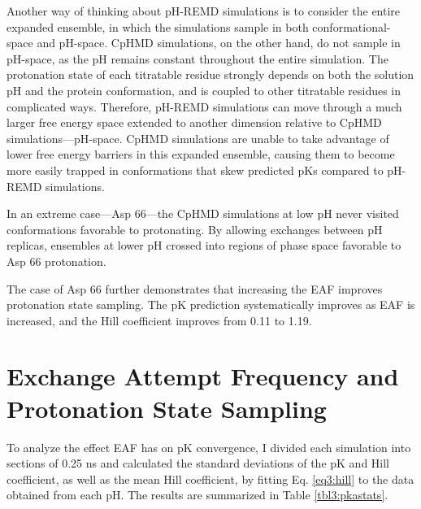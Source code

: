 Another way of thinking about pH-REMD simulations is to consider the entire
expanded ensemble, in which the simulations sample in both conformational-space
and pH-space.  CpHMD simulations, on the other hand, do not sample in pH-space,
as the pH remains constant throughout the entire simulation.  The protonation
state of each titratable residue strongly depends on both the solution pH and
the protein conformation, and is coupled to other titratable residues in
complicated ways.  Therefore, pH-REMD simulations can move through a much larger
free energy space extended to another dimension relative to CpHMD
simulations---pH-space.  CpHMD simulations are unable to take advantage of lower
free energy barriers in this expanded ensemble, causing them to become more
easily trapped in conformations that skew predicted pKs compared to
pH-REMD simulations.

In an extreme case---Asp 66---the CpHMD simulations at low pH never visited
conformations favorable to protonating.  By allowing exchanges between pH
replicas, ensembles at lower pH crossed into regions of phase space favorable to
Asp 66 protonation.

The case of Asp 66 further demonstrates that increasing the EAF improves
protonation state sampling.  The pK prediction systematically improves as
EAF is increased, and the Hill coefficient improves from 0.11 to 1.19.

\section{Exchange Attempt Frequency and Protonation State Sampling}

To analyze the effect EAF has on pK convergence, I divided each
simulation into sections of 0.25 ns and calculated the standard deviations of
the pK and Hill coefficient, as well as the mean Hill coefficient, by
fitting Eq. \ref{eq3:hill} to the data obtained from each pH.  The results are
summarized in Table \ref{tbl3:pkastats}.

